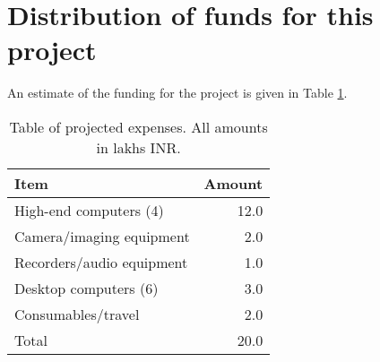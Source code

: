 \documentclass{article}
\begin{document}

\section{Distribution of funds for this project}

An estimate of the funding for the project is given in Table \ref{tab:funding}.

\begin{table}[th]
\centering
\caption{Table of projected expenses. All amounts in lakhs INR.}
\begin{tabular}{|l|r|}
\hline
Item & Amount \\
\hline
High-end computers (4) & 12.0 \\
Camera/imaging equipment & 2.0 \\
Recorders/audio equipment & 1.0 \\
Desktop computers (6) & 3.0 \\
Consumables/travel & 2.0 \\
\hline
Total & 20.0 \\
\hline
\end{tabular}
\label{tab:funding}
\end{table}
\end{document}
